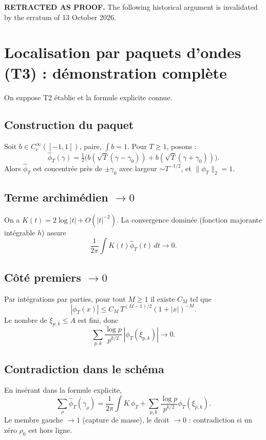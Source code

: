 \par\noindent\textbf{RETRACTED AS PROOF.} The following historical argument is invalidated by the erratum of 13 October 2026.\par
\section{Localisation par paquets d’ondes (T3) : démonstration complète}

On suppose T2 établie et la formule explicite connue.

\subsection{Construction du paquet}
Soit $b\in C_c^\infty([-1,1])$, paire, $\int b=1$.
Pour $T\ge1$, posons :
\[
\widehat{\phi}_T(\gamma)
=\tfrac12\big(b(\sqrt{T}(\gamma-\gamma_0))+b(\sqrt{T}(\gamma+\gamma_0))\big).
\]
Alors $\widehat{\phi}_T$ est concentrée près de $\pm\gamma_0$ avec largeur $\sim T^{-1/2}$, et $\|\phi_T\|_2=1$.

\subsection{Terme archimédien \texorpdfstring{$\to0$}{to0}}
On a $K(t)=2\log|t|+O(|t|^{-2})$.
La convergence dominée (fonction majorante intégrable $h$) assure
\[
\frac{1}{2\pi}\int K(t)\widehat{\phi}_T(t)\,dt\to0.
\]

\subsection{Côté premiers \texorpdfstring{$\to0$}{to0}}
Par intégrations par parties, pour tout $M\ge1$ il existe $C_M$ tel que
\[
|\phi_T(x)|\le C_M\,T^{(M-1)/2}(1+|x|)^{-M}.
\]
Le nombre de $\xi_{p,k}\le A$ est fini, donc
\[
\sum_{p,k}\frac{\log p}{p^{k/2}}\,|\phi_T(\xi_{p,k})|\to0.
\]

\subsection{Contradiction dans le schéma}
En insérant dans la formule explicite,
\[
\sum_{\rho}\widehat{\phi}_T(\gamma_\rho)
=\frac{1}{2\pi}\int K\,\widehat{\phi}_T
+\sum_{p,k}\frac{\log p}{p^{k/2}}\phi_T(\xi_{p,k}).
\]
Le membre gauche $\to1$ (capture de masse), le droit $\to0$ : contradiction si un zéro $\rho_0$ est hors ligne.

